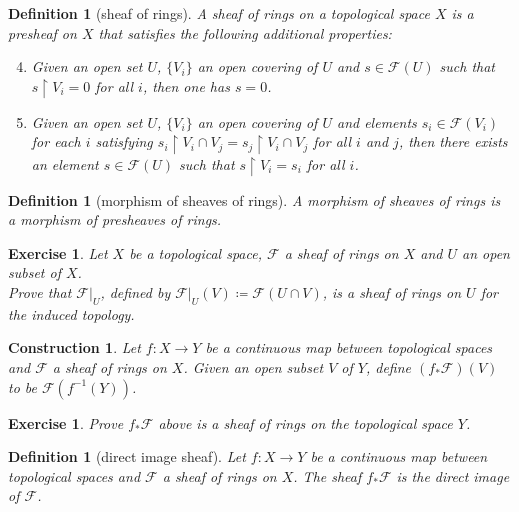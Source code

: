 \documentclass[12pt]{article}
\newtheorem{definition}[proposition]{Definition}
\newtheorem{ex}[proposition]{Exercise}
\newtheorem{cons}[proposition]{Construction}
\begin{document}
\begin{definition}[sheaf of rings]
	A sheaf of rings on a topological space $X$ is a presheaf on $X$ that satisfies the following additional properties:
	\begin{enumerate}
	\setcounter{enumi}{3}
		\item Given an open set $U$, $\lbrace V_i \rbrace$ an open covering of $U$ and $s \in \mathscr{F}(U)$ such that $s \restriction V_i = 0$ for all $i$, then one has $s = 0$.
		\item Given an open set $U$, $\lbrace V_i \rbrace$ an open covering of $U$ and elements $s_i \in \mathscr{F}(V_i)$ for each $i$ satisfying $s_i \restriction V_i \cap V_j = s_j \restriction V_i \cap V_j$ for all $i$ and $j$, then there exists an element $s \in \mathscr{F}(U)$ such that $s \restriction V_i = s_i$ for all $i$.  
	\end{enumerate}	
\end{definition}

\begin{definition}[morphism of sheaves of rings]
	A morphism of sheaves of rings is a morphism of presheaves of rings.
\end{definition}

\begin{ex}
	Let $X$ be a topological space, $\mathscr{F}$ a sheaf of rings on $X$ and $U$ an open subset of $X$. \\ Prove that $\mathscr{F}|_U$, defined by $\mathscr{F}|_U(V) \coloneqq \mathscr{F}(U \cap V)$, is a sheaf of rings on $U$ for the induced topology.
\end{ex}		

\begin{cons}
	Let $f: X \rightarrow Y$ be a continuous map between topological spaces and $\mathscr{F}$ a sheaf of rings on $X$. Given an open subset $V$ of $Y$, define $(f_{*} \mathscr{F})(V)$ to be $\mathscr{F} (f^{-1}(Y))$.  
\end{cons}

\begin{ex}
	Prove $f_{*} \mathscr{F}$ above is a sheaf of rings on the topological space $Y$.  
\end{ex}

\begin{definition}[direct image sheaf]
	Let $f: X \rightarrow Y$ be a continuous map between topological spaces and $\mathscr{F}$ a sheaf of rings on $X$. The sheaf $f_{*} \mathscr{F}$ is the direct image of $\mathscr{F}$. 
\end{definition}		
\end{document}
